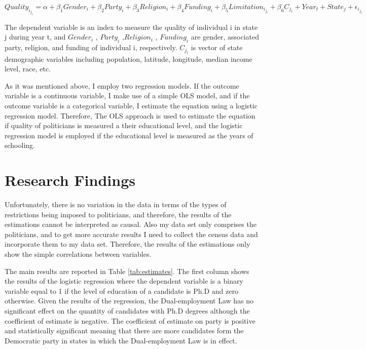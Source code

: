 \documentclass[12pt,english]{article}
\begin{document}
$Quality_i_j_t = \alpha + \beta_1 Gender_i + \beta_2 Party_i + \beta_3 Religion_i + \beta_4 Funding_i + \beta_5 Limitation_i_j_t + \beta_6 C_j_t + Year_t + State_j + \epsilon_i_j_t $



The dependent variable is an index to measure the quality of individual i in state j during year t, and  $Gender_i$ ,  $Party_i$ ,$Religion_i$ ,  $Funding_i$  are gender, associated party, religion, and funding of individual i, respectively. $C_j_t$ is vector of state demographic variables including population, latitude, longitude, median income level, race, etc.

As it was mentioned above, I employ two regression models. If the outcome variable is a continuous variable, I make use of a simple OLS model, and if the outcome variable is a categorical variable, I estimate the equation using a logistic regression model. Therefore, The OLS approach is used to estimate the equation if quality of politicians is measured a their educational level, and the logistic regression model is employed if the educational level is measured as the years of schooling.




\section{Research Findings}\label{sec:results}
Unfortunately, there is no variation in the data in terms of the types of restrictions being imposed to politicians, and therefore, the results of the estimations cannot be interpreted as causal. Also my data set only comprises the politicians, and to get more accurate results I need to collect the census data and incorporate them to my data set. Therefore, the results of the estimations only show the simple correlations between variables. 


The main results are reported in Table \ref{tab:estimates}. The first column shows the results of the logistic regression where the dependent variable is a binary variable equal to 1 if the level of  education of a candidate is Ph.D and zero otherwise. Given the results of the regression, the Dual-employment Law has no significant effect on the quantity of candidates with Ph.D degrees although the coefficient of estimate is negative. The coefficient of estimate on party is positive and statistically significant meaning that there are more candidates form the Democratic party in states in which the Dual-employment Law is in effect.
\end{document}
